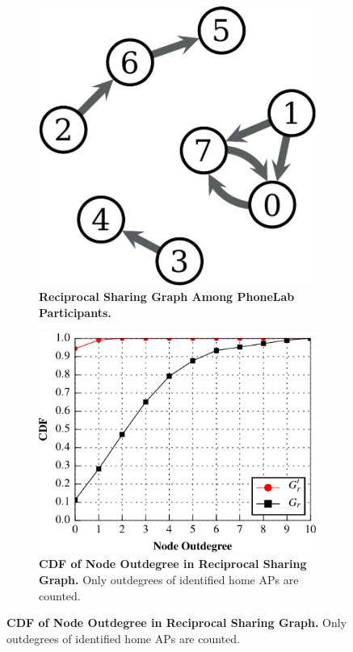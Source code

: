 \begin{figure}[t]
  \centering
  \begin{subfigure}{\columnwidth}
    \centering
    \includegraphics[width=0.5\columnwidth]{./figures/ReciprocalSharingFigure.pdf}
    \caption{\textbf{Reciprocal Sharing Graph Among PhoneLab Participants.}}
    \label{fig:reciprocal}
  \end{subfigure}
  \begin{subfigure}{\columnwidth}
    \includegraphics[width=\columnwidth]{./figures/SpatialSparseFigure.pdf}
    \caption{\textbf{CDF of Node Outdegree in Reciprocal Sharing Graph.} Only
    outdegrees of identified \PhoneLab{} home APs are counted. }
    \label{fig:sparse}
  \end{subfigure}
\end{figure}

